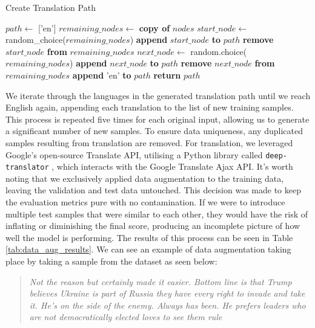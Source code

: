 \begin{algorithm}[H]
    \caption{Create Translation Path}
    \begin{algorithmic}[1]
        \State $path \gets $ ['en']
        \State $remaining\_nodes \gets $ \textbf{copy of} $nodes$
        \State
        \State $start\_node \gets $ random\_choice($remaining\_nodes$)
        \State \textbf{append} $start\_node$ \textbf{to} $path$
        \State \textbf{remove} $start\_node$ \textbf{from} $remaining\_nodes$
        \State
        \State $next\_node \gets $ random.choice($remaining\_nodes$)
        \State \textbf{append} $next\_node$ \textbf{to} $path$
        \State \textbf{remove} $next\_node$ \textbf{from} $remaining\_nodes$
        \EndWhile
        \State
        \State \textbf{append} 'en' \textbf{to} $path$
        \State \textbf{return} $path$
        \EndFunction
    \end{algorithmic}
    \label{alg:translation_path}
\end{algorithm}

We iterate through the languages in the generated translation path until we reach English again, appending each translation to the list of new training samples. This process is repeated five times for each original input, allowing us to generate a significant number of new samples. To ensure data uniqueness, any duplicated samples resulting from translation are removed. For translation, we leveraged Google's open-source Translate API, utilising a Python library called \verb|deep-translator| \cite{deep_translator}, which interacts with the Google Translate Ajax API. It's worth noting that we exclusively applied data augmentation to the training data, leaving the validation and test data untouched. This decision was made to keep the evaluation metrics pure with no contamination. If we were to introduce multiple test samples that were similar to each other, they would have the risk of inflating or diminishing the final score, producing an incomplete picture of how well the model is performing. The results of this process can be seen in Table \ref{tab:data_aug_results}. We can see an example of data augmentation taking place by taking a sample from the dataset as seen below:

\begin{quote}
    \textit{Not the reason but certainly made it easier. Bottom line is that Trump believes Ukraine is part of Russia they have every right to invade and take it. He's on the side of the enemy. Always has been. He prefers leaders who are not democratically elected loves to see them rule}
\end{quote}

